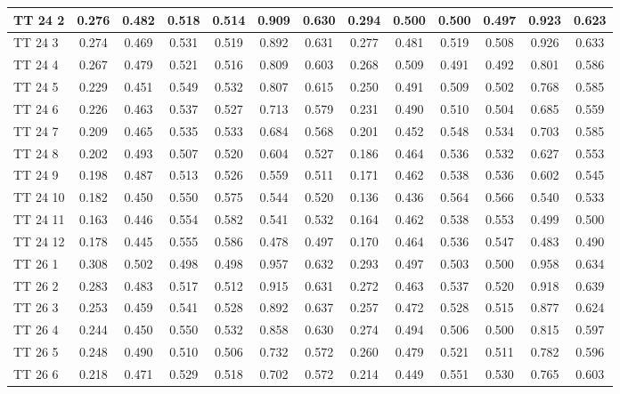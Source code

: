 \documentclass{article}
\begin{document}
\begin{tabular}{|l|c|c|c|c|c|c||c|c|c|c|c|c|}
TT 24  2 & 0.276 & 0.482 & 0.518 & 0.514 & 0.909 & 0.630 & 0.294 & 0.500 & 0.500 & 0.497 & 0.923 & 0.623\\ \hline
TT 24  3 & 0.274 & 0.469 & 0.531 & 0.519 & 0.892 & 0.631 & 0.277 & 0.481 & 0.519 & 0.508 & 0.926 & 0.633\\ \hline
TT 24  4 & 0.267 & 0.479 & 0.521 & 0.516 & 0.809 & 0.603 & 0.268 & 0.509 & 0.491 & 0.492 & 0.801 & 0.586\\ \hline
TT 24  5 & 0.229 & 0.451 & 0.549 & 0.532 & 0.807 & 0.615 & 0.250 & 0.491 & 0.509 & 0.502 & 0.768 & 0.585\\ \hline
TT 24  6 & 0.226 & 0.463 & 0.537 & 0.527 & 0.713 & 0.579 & 0.231 & 0.490 & 0.510 & 0.504 & 0.685 & 0.559\\ \hline
TT 24  7 & 0.209 & 0.465 & 0.535 & 0.533 & 0.684 & 0.568 & 0.201 & 0.452 & 0.548 & 0.534 & 0.703 & 0.585\\ \hline
TT 24  8 & 0.202 & 0.493 & 0.507 & 0.520 & 0.604 & 0.527 & 0.186 & 0.464 & 0.536 & 0.532 & 0.627 & 0.553\\ \hline
TT 24  9 & 0.198 & 0.487 & 0.513 & 0.526 & 0.559 & 0.511 & 0.171 & 0.462 & 0.538 & 0.536 & 0.602 & 0.545\\ \hline
TT 24 10 & 0.182 & 0.450 & 0.550 & 0.575 & 0.544 & 0.520 & 0.136 & 0.436 & 0.564 & 0.566 & 0.540 & 0.533\\ \hline
TT 24 11 & 0.163 & 0.446 & 0.554 & 0.582 & 0.541 & 0.532 & 0.164 & 0.462 & 0.538 & 0.553 & 0.499 & 0.500\\ \hline
TT 24 12 & 0.178 & 0.445 & 0.555 & 0.586 & 0.478 & 0.497 & 0.170 & 0.464 & 0.536 & 0.547 & 0.483 & 0.490\\ \hline
TT 26  1 & 0.308 & 0.502 & 0.498 & 0.498 & 0.957 & 0.632 & 0.293 & 0.497 & 0.503 & 0.500 & 0.958 & 0.634\\ \hline
TT 26  2 & 0.283 & 0.483 & 0.517 & 0.512 & 0.915 & 0.631 & 0.272 & 0.463 & 0.537 & 0.520 & 0.918 & 0.639\\ \hline
TT 26  3 & 0.253 & 0.459 & 0.541 & 0.528 & 0.892 & 0.637 & 0.257 & 0.472 & 0.528 & 0.515 & 0.877 & 0.624\\ \hline
TT 26  4 & 0.244 & 0.450 & 0.550 & 0.532 & 0.858 & 0.630 & 0.274 & 0.494 & 0.506 & 0.500 & 0.815 & 0.597\\ \hline
TT 26  5 & 0.248 & 0.490 & 0.510 & 0.506 & 0.732 & 0.572 & 0.260 & 0.479 & 0.521 & 0.511 & 0.782 & 0.596\\ \hline
TT 26  6 & 0.218 & 0.471 & 0.529 & 0.518 & 0.702 & 0.572 & 0.214 & 0.449 & 0.551 & 0.530 & 0.765 & 0.603\\ \hline

\end{tabular}
\end{document}
